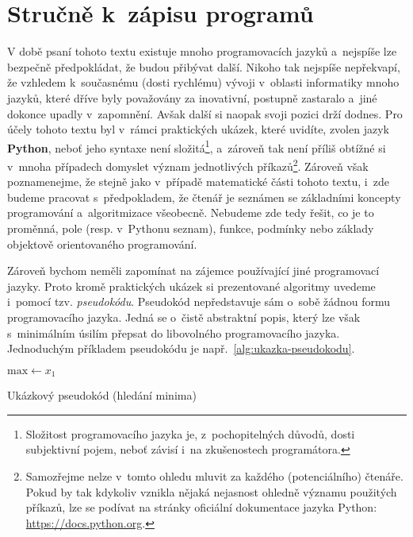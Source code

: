 \section{Stručně k~zápisu programů}\label{sec:zapis-programu}

V době psaní tohoto textu existuje mnoho programovacích jazyků a~nejspíše lze bezpečně předpokládat, že budou přibývat další. Nikoho tak nejspíše nepřekvapí, že vzhledem k~současnému (dosti rychlému) vývoji v~oblasti informatiky mnoho jazyků, které dříve byly považovány za inovativní, postupně zastaralo a~jiné dokonce upadly v~zapomnění. Avšak další si naopak svoji pozici drží dodnes. Pro účely tohoto textu byl v~rámci praktických ukázek, které uvidíte, zvolen jazyk \textbf{Python}, neboť jeho syntaxe není složitá\footnote{Složitost programovacího jazyka je, z~pochopitelných důvodů, dosti subjektivní pojem, neboť závisí i~na zkušenostech programátora.}, a~zároveň tak není příliš obtížné si v~mnoha případech domyslet význam jednotlivých příkazů\footnote{Samozřejme nelze v~tomto ohledu mluvit za každého (potenciálního) čtenáře. Pokud by tak kdykoliv vznikla nějaká nejasnost ohledně významu použitých příkazů, lze se podívat na stránky oficiální dokumentace jazyka Python: \url{https://docs.python.org}.}. Zároveň však poznamenejme, že stejně jako v~případě matematické části tohoto textu, i~zde budeme pracovat s~předpokladem, že čtenář je seznámen se základními koncepty programování a~algoritmizace všeobecně. Nebudeme zde tedy řešit, co je to proměnná, pole (resp. v~Pythonu seznam), funkce, podmínky nebo základy objektově orientovaného programování.

Zároveň bychom neměli zapomínat na zájemce používající jiné programovací jazyky. Proto kromě praktických ukázek si prezentované algoritmy uvedeme i~pomocí tzv. \emph{pseudokódu}. Pseudokód nepředstavuje sám o~sobě žádnou formu programovacího jazyka. Jedná se o~čistě abstraktní popis, který lze však s~minimálním úsilím přepsat do libovolného programovacího jazyka. Jednoduchým příkladem pseudokódu je např.~\ref{alg:ukazka-pseudokodu}.
\begin{algorithm}
    $\text{max}\gets x_1$\;
    \caption{Ukázkový pseudokód (hledání minima)}
    \label{alg:ukazka-pseudokodu}
\end{algorithm}

